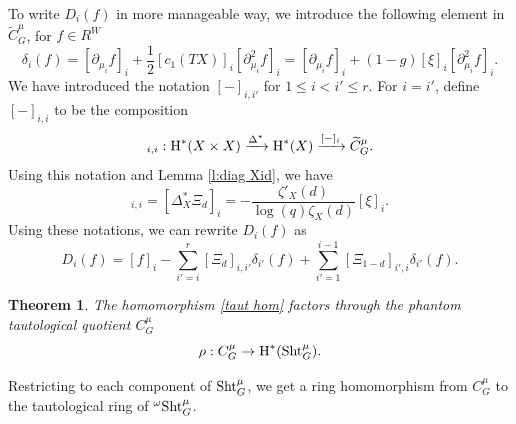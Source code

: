 \documentclass[reqno]{amsart}
\numberwithin{equation}{subsection}
\newtheorem{theorem}[subsubsection]{Theorem}
\theoremstyle{definition}
\newcommand\id{\textup{id}}
\newcommand\Sht{\textup{Sht}}
\newcommand{\wt}[1]{\widetilde{#1}}
\newcommand\ot{\otimes}
\newcommand{\cohog}[2]{\textup{H}^{#1}({#2})}     %
\newcommand\xr{\xrightarrow}
\renewcommand\d\delta
\newcommand\D\Delta
\renewcommand\r\rho
\newcommand{\z}{\zeta}
\newcommand{\om}{\omega}
\newcommand\pl{\partial}
\begin{document}
To write $D_i(f)$ in more manageable way,  we introduce the following element in $\wt C^\mu_G$, for $f\in R^W$
\begin{equation*}
    \d_i(f)=[\pl_{\mu_i}f]_i+\frac{1}{2}[c_1(TX)]_i[\pl^2_{\mu_i}f]_i=[\pl_{\mu_i}f]_i+(1-g)[\xi]_i[\pl^2_{\mu_i}f]_i.
\end{equation*}
We have introduced the notation $[-]_{i,i'}$ for $1\le i<i'\le r$. For $i=i'$, define $[-]_{i,i}$ to be the composition
\begin{equation*}
    [-]_{i,i}: \cohog{*}{X\times X}\xr{\D^*}\cohog{*}{X}\xr{[-]_i} \wt C^\mu_G.
\end{equation*}
Using this notation and Lemma \ref{l:diag Xid}, we have
\begin{equation*}
    [\Xi_d]_{i,i}=[\D_X^*\Xi_d]_i=-\frac{\z'_X(d)}{\log(q)\z_X(d)}[\xi]_{i}.
\end{equation*}
Using these notations, we can rewrite $D_i(f)$ as
\begin{equation}\label{rel in C better}
    D_i(f)=[f]_i-\sum_{i'=i}^{r}[\Xi_d]_{i,i'}\d_{i'}(f)+\sum_{i'=1}^{i-1}[\Xi_{1-d}]_{i',i}\d_{i'}(f).
\end{equation}



\begin{theorem}\label{th:taut hom quot}
    The homomorphism \eqref{taut hom} factors through the phantom tautological quotient $C^\mu_G$
    \begin{equation}\label{taut hom quot}
        \r: C^\mu_G\to \cohog{*}{\Sht^\mu_G}.
    \end{equation}
\end{theorem}

Restricting to each component of $\Sht^\mu_G$, we get a ring homomorphism from $C^\mu_G$ to the tautological ring of ${}^\om\Sht^\mu_G$.
\end{document}
